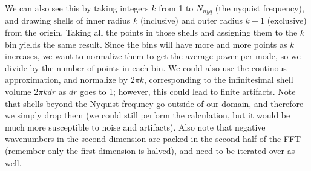\documentclass{article}
\begin{document}
We can also see this by taking integers $k$ from 1 to $N_{nyq}$ (the nyquist frequency), and drawing shells of inner radius $k$ (inclusive) and outer radius $k+1$ (exclusive) from the origin. Taking all the points in those shells and assigning them to the $k$ bin yields the same result. Since the bins will have more and more points as $k$ increases, we want to normalize them to get the average power per mode, so we divide by the number of points in each bin. We could also use the continous approximation, and normalize by $2\pi k$, corresponding to the infinitesimal shell volume $2\pi kdr$ as $dr$ goes to 1; however, this could lead to finite artifacts. Note that shells beyond the Nyquist frequncy go outside of our domain, and therefore we simply drop them (we could still perform the calculation, but it would be much more susceptible to noise and artifacts). Also note that negative wavenumbers in the second dimension are packed in the second half of the FFT (remember only the first dimension is halved), and need to be iterated over as well.
\end{document}
